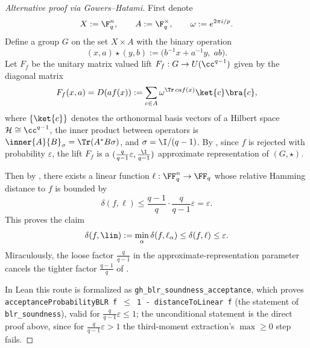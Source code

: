 \begin{proof}[Alternative proof via Gowers–Hatami]\leanok
First denote
\[
X := \F_q^n, \qquad A := \F_q^\times, \qquad \omega := e^{2\pi i/p}.
\]
Define a group $G$ on the set $X \times A$ with the binary operation
\[
(x, a) \star (y, b) := \bigl(b^{-1}x + a^{-1}y,\; ab\bigr).
\]
Let $F_f$ be the unitary matrix valued lift $F_f : G \to U(\cc^{q-1})$ given by the diagonal matrix
\[
F_f(x, a) = D(a f(x)) := \sum_{c \in A} \omega^{\Tr\, c a f(x)}\ket{c}\bra{c},
\]
where $\{\ket{c}\}$ denotes the orthonormal basis vectors of a Hilbert space $\mathcal{H} \cong \cc^{q-1}$, the
inner product between operators is $\inner{A}{B}_\sigma=\Tr(A^* B \sigma)$, and $\sigma = \I/(q-1)$. By
, since $f$ is rejected with probability $\varepsilon$, the lift $F_f$ is a
$(\frac{q}{q-1}\varepsilon,\frac{\I}{q-1})$ approximate representation of $(G, \star)$.

Then by , there exists a linear function $\ell: \FF_q^n \to \FF_q$ whose
relative Hamming distance to $f$ is bounded by
\[
    \delta(f, \ell) \le \frac{q-1}{q}\cdot\frac{q}{q-1}\varepsilon = \varepsilon.
\]
This proves the claim
\[
\delta(f, \lin) := \min_{\alpha} \delta(f, \ell_\alpha) \leq \delta(f, \ell) \leq \varepsilon.
\]
Miraculously, the loose factor $\frac{q}{q-1}$ in the approximate-representation parameter cancels the tighter
factor $\frac{q-1}{q}$ of .

In Lean this route is formalized as \texttt{gh\_blr\_soundness\_acceptance}, which proves
\texttt{acceptanceProbabilityBLR f $\le$ 1 - distanceToLinear f} (the statement of \texttt{blr\_soundness}),
valid for $\frac{q}{q-1}\varepsilon\le1$; the unconditional statement is the direct proof above, since for
$\frac{q}{q-1}\varepsilon>1$ the third-moment extraction's $\max\ge0$ step fails.
\end{proof}



